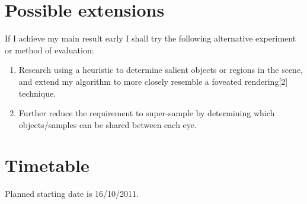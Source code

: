 \documentclass[12pt,a4paper,twoside]{article}
\begin{document}
\section*{Possible extensions}

If I achieve my main result early I shall try the following
alternative experiment or method of evaluation:

\begin{enumerate}

\item Research using a heuristic to determine salient objects or regions in the scene, and extend my algorithm to more closely resemble a foveated rendering[2] technique.

\item Further reduce the requirement to super-sample by determining which objects/samples can be shared between each eye.

\end{enumerate}





\section*{Timetable}

Planned starting date is 16/10/2011.
\end{document}
